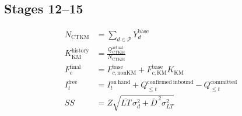 \documentclass{article}
\begin{document}
\subsection*{Stages 12--15}
\begin{align*}
N_{\mathrm{CTKM}}&=\sum_{d\in\mathcal{P}}Y_d^{\mathrm{base}} \\
K_{\mathrm{KM}}^{\mathrm{history}}&=\frac{Q_{\mathrm{CTKM}}^{\mathrm{actual}}}{N_{\mathrm{CTKM}}} \\
F_c^{\mathrm{final}}&=F_{c,\mathrm{nonKM}}^{\mathrm{base}}+F_{c,\mathrm{KM}}^{\mathrm{base}}K_{\mathrm{KM}} \\
I_t^{\mathrm{free}}&=I_t^{\mathrm{on\ hand}}+Q_{\le t}^{\mathrm{confirmed\ inbound}}-Q_{\le t}^{\mathrm{committed}} \\
SS&=Z\sqrt{\overline{LT}\,\sigma_d^2+\overline{D}^{\,2}\sigma_{LT}^2}
\end{align*}
\end{document}
